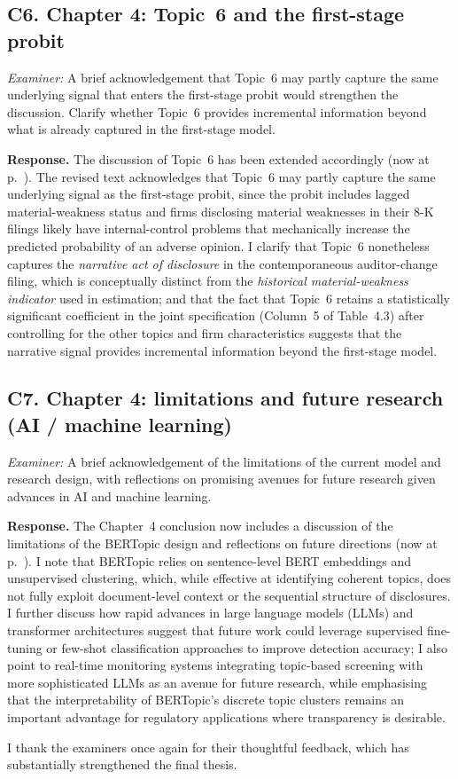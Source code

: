 \documentclass[11pt,a4paper]{article}
\newcommand{\nowat}[1]{(now at p.~\pageref{#1})}
\begin{document}
\subsection*{C6. Chapter 4: Topic~6 and the first-stage probit}
\textit{Examiner:} A brief acknowledgement that Topic~6 may partly capture the same underlying signal that enters the first-stage probit would strengthen the discussion. Clarify whether Topic~6 provides incremental information beyond what is already captured in the first-stage model.

\noindent\textbf{Response.} The discussion of Topic~6 has been extended accordingly \nowat{viva:c4-topic6}. The revised text acknowledges that Topic~6 may partly capture the same underlying signal as the first-stage probit, since the probit includes lagged material-weakness status and firms disclosing material weaknesses in their 8-K filings likely have internal-control problems that mechanically increase the predicted probability of an adverse opinion. I clarify that Topic~6 nonetheless captures the \emph{narrative act of disclosure} in the contemporaneous auditor-change filing, which is conceptually distinct from the \emph{historical material-weakness indicator} used in estimation; and that the fact that Topic~6 retains a statistically significant coefficient in the joint specification (Column~5 of Table~4.3) after controlling for the other topics and firm characteristics suggests that the narrative signal provides incremental information beyond the first-stage model.

\subsection*{C7. Chapter 4: limitations and future research (AI / machine learning)}
\textit{Examiner:} A brief acknowledgement of the limitations of the current model and research design, with reflections on promising avenues for future research given advances in AI and machine learning.

\noindent\textbf{Response.} The Chapter~4 conclusion now includes a discussion of the limitations of the BERTopic design and reflections on future directions \nowat{viva:c4-future}. I note that BERTopic relies on sentence-level BERT embeddings and unsupervised clustering, which, while effective at identifying coherent topics, does not fully exploit document-level context or the sequential structure of disclosures. I further discuss how rapid advances in large language models (LLMs) and transformer architectures suggest that future work could leverage supervised fine-tuning or few-shot classification approaches to improve detection accuracy; I also point to real-time monitoring systems integrating topic-based screening with more sophisticated LLMs as an avenue for future research, while emphasising that the interpretability of BERTopic's discrete topic clusters remains an important advantage for regulatory applications where transparency is desirable.

\vspace{1em}

\noindent I thank the examiners once again for their thoughtful feedback, which has substantially strengthened the final thesis.
\end{document}
